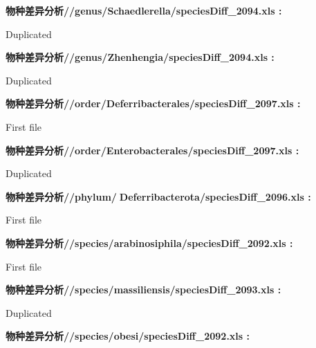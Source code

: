 \documentclass[
]{article}
\begin{document}
\begin{center}
\begin{tcolorbox}[colback=gray!10, colframe=gray!50, width=0.9\linewidth, arc=1mm, boxrule=0.5pt]
\textbf{
物种差异分析//genus/Schaedlerella/speciesDiff\_2094.xls
:}

\vspace{0.5em}

    Duplicated

\vspace{2em}


\textbf{
物种差异分析//genus/Zhenhengia/speciesDiff\_2094.xls
:}

\vspace{0.5em}

    Duplicated

\vspace{2em}


\textbf{
物种差异分析//order/Deferribacterales/speciesDiff\_2097.xls
:}

\vspace{0.5em}

    First file

\vspace{2em}


\textbf{
物种差异分析//order/Enterobacterales/speciesDiff\_2097.xls
:}

\vspace{0.5em}

    Duplicated

\vspace{2em}


\textbf{
物种差异分析//phylum/Deferribacterota/speciesDiff\_2096.xls
:}

\vspace{0.5em}

    First file

\vspace{2em}


\textbf{
物种差异分析//species/arabinosiphila/speciesDiff\_2092.xls
:}

\vspace{0.5em}

    First file

\vspace{2em}


\textbf{
物种差异分析//species/massiliensis/speciesDiff\_2093.xls
:}

\vspace{0.5em}

    Duplicated

\vspace{2em}


\textbf{
物种差异分析//species/obesi/speciesDiff\_2092.xls
:}


\end{tcolorbox}
\end{center}
\end{document}
